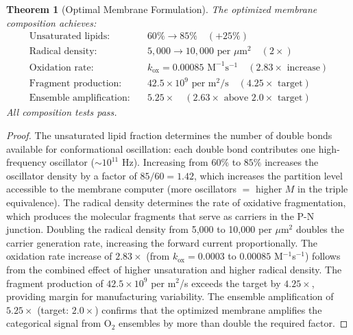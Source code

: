 \documentclass[12pt]{article}
\newtheorem{theorem}{Theorem}[section]
\theoremstyle{definition}
\theoremstyle{remark}
\begin{document}
\begin{theorem}[Optimal Membrane Formulation]
\label{thm:composition}
The optimized membrane composition achieves:
\begin{align}
\text{Unsaturated lipids:} &\quad 60\% \to 85\% \quad (+25\%) \label{eq:unsaturated} \\
\text{Radical density:} &\quad 5{,}000 \to 10{,}000 \text{ per } \mu\text{m}^2 \quad (2\times) \label{eq:radical} \\
\text{Oxidation rate:} &\quad k_{\mathrm{ox}} = 0.00085 \text{ M}^{-1}\text{s}^{-1} \quad (2.83\times \text{ increase}) \label{eq:oxidation} \\
\text{Fragment production:} &\quad 42.5 \times 10^9 \text{ per m}^2/\text{s} \quad (4.25\times \text{ target}) \label{eq:fragments} \\
\text{Ensemble amplification:} &\quad 5.25\times \quad (2.63\times \text{ above } 2.0\times \text{ target}) \label{eq:amplification}
\end{align}
All composition tests pass.
\end{theorem}

\begin{proof}
The unsaturated lipid fraction determines the number of double bonds available for conformational oscillation: each double bond contributes one high-frequency oscillator ($\sim 10^{11}$ Hz). Increasing from $60\%$ to $85\%$ increases the oscillator density by a factor of $85/60 = 1.42$, which increases the partition level accessible to the membrane computer (more oscillators $=$ higher $M$ in the triple equivalence). The radical density determines the rate of oxidative fragmentation, which produces the molecular fragments that serve as carriers in the P-N junction. Doubling the radical density from 5,000 to 10,000 per $\mu$m$^2$ doubles the carrier generation rate, increasing the forward current proportionally. The oxidation rate increase of $2.83\times$ (from $k_{\mathrm{ox}} = 0.0003$ to $0.00085$ M$^{-1}$s$^{-1}$) follows from the combined effect of higher unsaturation and higher radical density. The fragment production of $42.5 \times 10^9$ per m$^2$/s exceeds the target by $4.25\times$, providing margin for manufacturing variability. The ensemble amplification of $5.25\times$ (target: $2.0\times$) confirms that the optimized membrane amplifies the categorical signal from O$_2$ ensembles by more than double the required factor. \qedhere
\end{proof}


\end{document}

